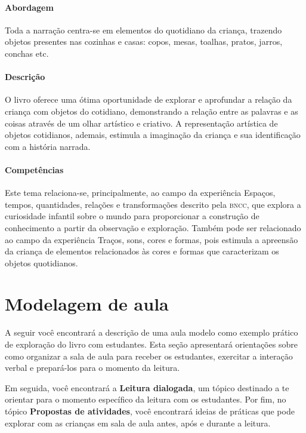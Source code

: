 \documentclass[11pt]{extarticle}
\begin{document}
\paragraph{Abordagem} Toda a narração centra-se em elementos do quotidiano da criança, trazendo objetos presentes nas cozinhas e casas: copos, mesas, toalhas, pratos, jarros, conchas etc.

\paragraph{Descrição} O livro oferece uma ótima oportunidade de explorar 
e aprofundar a relação da criança com objetos do cotidiano, demonstrando a relação entre as palavras e as coisas através de um olhar artístico e criativo. A representação artística de objetos cotidianos, ademais, estimula a imaginação da criança e sua identificação com a história narrada.

\paragraph{Competências} Este tema relaciona-se, principalmente, ao 
campo da experiência Espaços, tempos, quantidades, relações e transformações
descrito pela \textsc{bncc}, que explora a curiosidade infantil sobre o mundo 
para proporcionar a construção de conhecimento a partir da observação e exploração.
Também pode ser relacionado ao campo da experiência Traços, sons, cores e formas, pois estimula a apreensão da criança de elementos relacionados às cores e formas que caracterizam os objetos quotidianos.


\section{Modelagem de aula}
A seguir você encontrará a descrição de uma aula modelo como exemplo 
prático de exploração do livro com estudantes. Esta seção apresentará 
orientações sobre como organizar a sala de aula para receber os 
estudantes, exercitar a interação verbal e prepará-los para o 
momento da leitura.

Em seguida, você encontrará a \textbf{Leitura dialogada}, um 
tópico destinado a te orientar para o momento específico da 
leitura com os estudantes. Por fim, no tópico 
\textbf{Propostas de atividades}, você encontrará ideias 
de práticas que pode explorar com as crianças em sala de 
aula antes, após e durante a leitura. 
\end{document}
